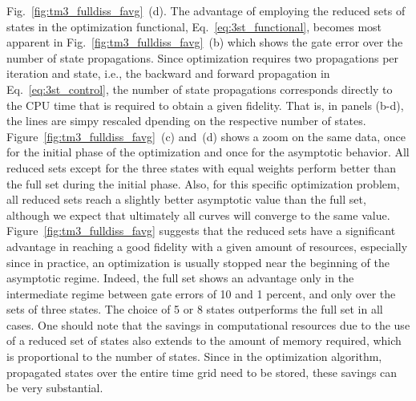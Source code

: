 Fig.~\ref{fig:tm3_fulldiss_favg}~(d).
The advantage of employing the reduced sets of
states in the optimization functional, Eq.~\eqref{eq:3st_functional},
becomes most apparent in Fig.~\ref{fig:tm3_fulldiss_favg}~(b)
which shows the gate error over the number of state
propagations. Since optimization requires two propagations per
iteration and state, i.e., the
backward and forward propagation in Eq.~\eqref{eq:3st_control}, the number
of state propagations corresponds directly to the CPU time that is
required to obtain a given
fidelity. That is, in panels (b-d), the lines are simpy rescaled dpending on the
respective number of states. Figure~\ref{fig:tm3_fulldiss_favg}~(c) and~(d)
shows a zoom on the same data, once for the initial phase
of the optimization and once for the asymptotic behavior. All reduced sets
except for the three states with equal weights perform better than the
full set during the
initial phase.  Also, for this specific optimization problem, all reduced sets
reach a slightly better asymptotic value than the full set, although we
expect that ultimately all curves will converge to the same value.
Figure~\ref{fig:tm3_fulldiss_favg} suggests that
the reduced sets have a significant
advantage in reaching a good fidelity with a given amount of resources, especially
since in practice, an optimization is usually stopped near the beginning of the
asymptotic regime. Indeed, the full set shows an advantage only in the
intermediate regime between gate errors of 10 and 1 percent, and only over the
sets of three states. The choice of 5 or 8 states outperforms the full set in
all cases.
One should note that the savings in computational resources due to the
use of a reduced set of
states also extends to the amount of memory required, which is proportional to
the number of states. Since in the optimization algorithm, propagated states
over the entire time grid need to be stored, these savings can be very
substantial.

